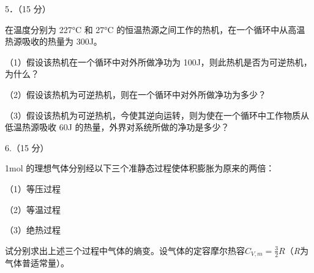 \documentclass[fontset=exam]{exam-zh}
\begin{document}
5．（15 分）

在温度分别为 227°C 和 27°C 的恒温热源之间工作的热机，在一个循环中从高温热源吸收的热量为 300J。

（1）假设该热机在一个循环中对外所做净功为 100J，则此热机是否为可逆热机，为什么？

（2）假设该热机为可逆热机，则在一个循环中对外所做净功为多少？

（3）假设该热机为可逆热机，今使其逆向运转，则为使在一个循环中工作物质从低温热源吸收 60J 的热量，外界对系统所做的净功是多少？

6.（15 分）

1mol 的理想气体分别经以下三个准静态过程使体积膨胀为原来的两倍：

（1）等压过程

（2）等温过程

（3）绝热过程

试分别求出上述三个过程中气体的熵变。设气体的定容摩尔热容\(C_{V,m} = \frac{3}{2}R\)（\emph{R}为气体普适常量）。
\end{document}
